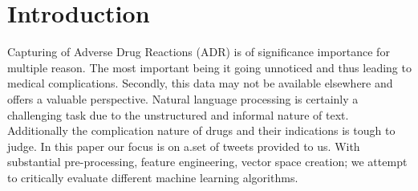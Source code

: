 \section{Introduction}
\label{sec-intro}

Capturing of Adverse Drug Reactions (ADR) is of significance importance for multiple reason. The most important being it going unnoticed and thus leading to medical complications. Secondly, this data may not be available elsewhere and offers a valuable perspective. Natural language processing is certainly a challenging task due to the unstructured and informal nature of text. Additionally the complication nature of drugs and their indications is tough to judge. In this paper our focus is on a.set of tweets provided to us. With substantial pre-processing, feature engineering, vector space creation; we attempt to critically evaluate different machine learning algorithms.







